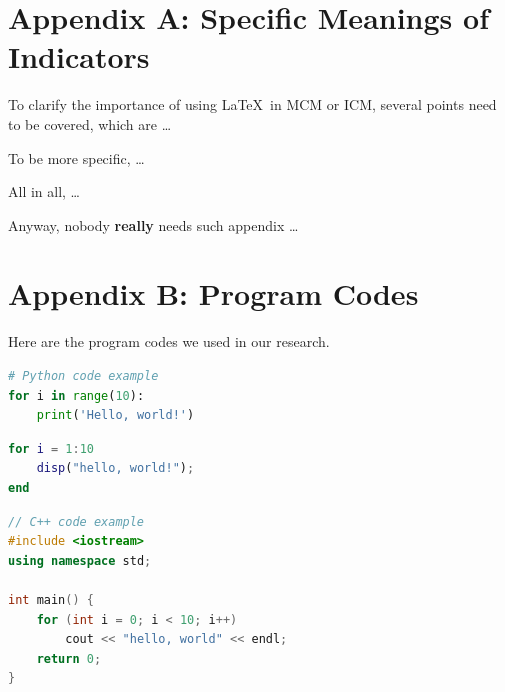 \documentclass[12pt]{article}  %
\begin{document}
\begin{subappendices}  %
\section{Appendix A: Specific Meanings of Indicators}
\label{a1}
To clarify the importance of using \LaTeX\ in MCM or ICM, several points need to be covered, which are \ldots

To be more specific, \ldots

All in all, \ldots

Anyway, nobody \textbf{really} needs such appendix \ldots

\section{Appendix B: Program Codes}
Here are the program codes we used in our research.


\begin{lstlisting}[language=Python, name={test.py}]
# Python code example
for i in range(10):
    print('Hello, world!')
\end{lstlisting}

\begin{lstlisting}[language=MATLAB, name={test.m}]
% MATLAB code example
for i = 1:10
    disp("hello, world!");
end
\end{lstlisting}

\begin{lstlisting}[language=C++, name={test.cpp}]
// C++ code example
#include <iostream>
using namespace std;

int main() {
    for (int i = 0; i < 10; i++)
        cout << "hello, world" << endl;
    return 0;
}
\end{lstlisting}

\end{subappendices}  %
\end{document}
